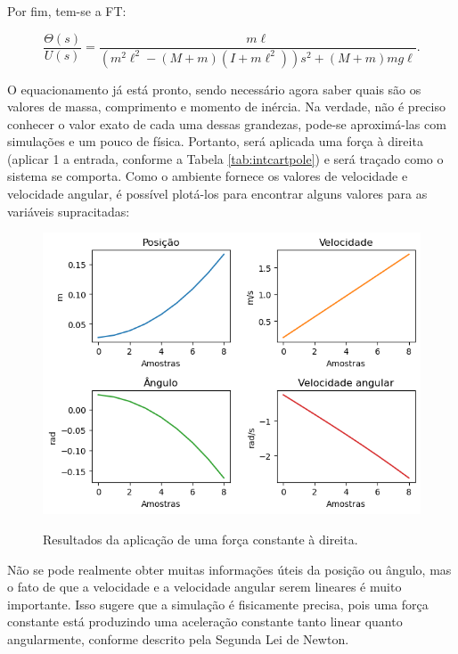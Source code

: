 \documentclass[12pt,           %
a4paper,                       %
openany,                       %
oneside,                       %
chapter=TITLE,                 %
english,                       %
spanish,                       %
brazil,                        %
sumario=tradicional]{abntex2}  %
\begin{document}
\begin{OnehalfSpace}
Por fim, tem-se a FT:

\begin{equation}
    \frac{\Theta (s)}{U(s)} = \frac{m\ell}{(m^2\ell^2-(M+m)(I+m\ell^2))s^2+(M+m)mg\ell}.
    \label{eq:TF}
\end{equation}

O equacionamento já está pronto, sendo necessário agora saber quais são os valores de massa, comprimento e momento de inércia. Na verdade, não é preciso conhecer o valor exato de cada uma dessas grandezas, pode-se aproximá-las com simulações e um pouco de física. Portanto, será aplicada uma força à direita (aplicar 1 a entrada, conforme a Tabela \ref{tab:intcartpole}) e será traçado como o sistema se comporta. Como o ambiente fornece os valores de velocidade e velocidade angular, é possível plotá-los para encontrar alguns valores para as variáveis supracitadas:

\begin{figure}[H]
     \centering
     \vspace*{-0.2cm}
     \caption{Resultados da aplicação de uma força constante à direita.}
     \includegraphics[scale=.55]{Grafico1.png}
     \label{fcte}
\end{figure}
\vspace*{-0.8cm}
{\raggedright {}}

Não se pode realmente obter muitas informações úteis da posição ou ângulo, mas o fato de que a velocidade e a velocidade angular serem lineares é muito importante. Isso sugere que a simulação é fisicamente precisa, pois uma força constante está produzindo uma aceleração constante tanto linear quanto angularmente, conforme descrito pela Segunda Lei de Newton.


\end{OnehalfSpace}
\end{document}

